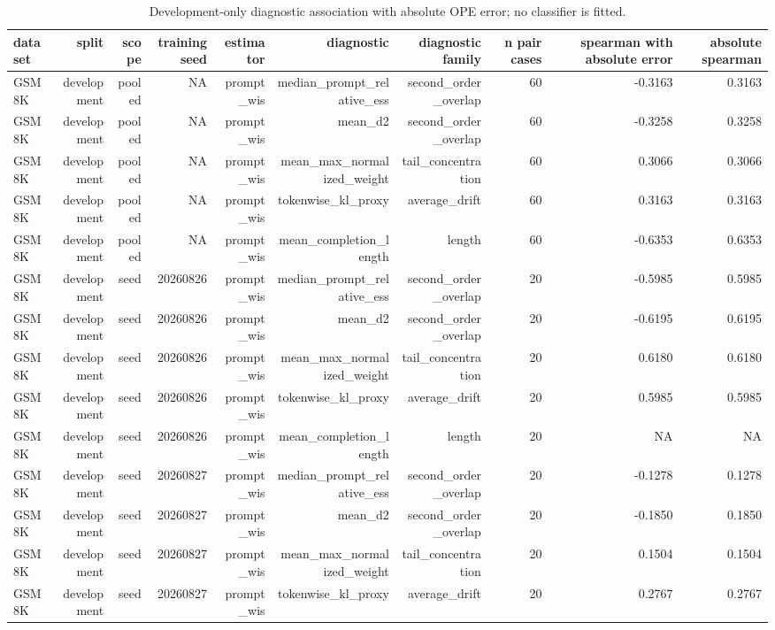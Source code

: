 \begin{table}[t]
\centering
\small
\caption{Development-only diagnostic association with absolute OPE error; no classifier is fitted.}
\label{tab:diagnostic\_benchmark}
\begin{tabular}{lrrrrrrrrr}
\toprule
dataset & split & scope & training seed & estimator & diagnostic & diagnostic family & n pair cases & spearman with absolute error & absolute spearman \\
\midrule
GSM8K & development & pooled & NA & prompt\_wis & median\_prompt\_relative\_ess & second\_order\_overlap & 60 & -0.3163 & 0.3163 \\
GSM8K & development & pooled & NA & prompt\_wis & mean\_d2 & second\_order\_overlap & 60 & -0.3258 & 0.3258 \\
GSM8K & development & pooled & NA & prompt\_wis & mean\_max\_normalized\_weight & tail\_concentration & 60 & 0.3066 & 0.3066 \\
GSM8K & development & pooled & NA & prompt\_wis & tokenwise\_kl\_proxy & average\_drift & 60 & 0.3163 & 0.3163 \\
GSM8K & development & pooled & NA & prompt\_wis & mean\_completion\_length & length & 60 & -0.6353 & 0.6353 \\
GSM8K & development & seed & 20260826 & prompt\_wis & median\_prompt\_relative\_ess & second\_order\_overlap & 20 & -0.5985 & 0.5985 \\
GSM8K & development & seed & 20260826 & prompt\_wis & mean\_d2 & second\_order\_overlap & 20 & -0.6195 & 0.6195 \\
GSM8K & development & seed & 20260826 & prompt\_wis & mean\_max\_normalized\_weight & tail\_concentration & 20 & 0.6180 & 0.6180 \\
GSM8K & development & seed & 20260826 & prompt\_wis & tokenwise\_kl\_proxy & average\_drift & 20 & 0.5985 & 0.5985 \\
GSM8K & development & seed & 20260826 & prompt\_wis & mean\_completion\_length & length & 20 & NA & NA \\
GSM8K & development & seed & 20260827 & prompt\_wis & median\_prompt\_relative\_ess & second\_order\_overlap & 20 & -0.1278 & 0.1278 \\
GSM8K & development & seed & 20260827 & prompt\_wis & mean\_d2 & second\_order\_overlap & 20 & -0.1850 & 0.1850 \\
GSM8K & development & seed & 20260827 & prompt\_wis & mean\_max\_normalized\_weight & tail\_concentration & 20 & 0.1504 & 0.1504 \\
GSM8K & development & seed & 20260827 & prompt\_wis & tokenwise\_kl\_proxy & average\_drift & 20 & 0.2767 & 0.2767 \\

\end{tabular}
\end{table}
